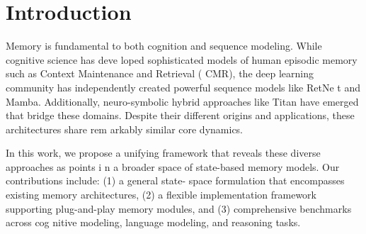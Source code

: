 \section{Introduction}
Memory is fundamental to both cognition and sequence modeling. While cognitive science has deve  loped sophisticated models of human episodic memory such as Context Maintenance and Retrieval (  CMR), the deep learning community has independently created powerful sequence models like RetNe  t and Mamba. Additionally, neuro-symbolic hybrid approaches like Titan have emerged that bridge   these domains. Despite their different origins and applications, these architectures share rem  arkably similar core dynamics.

In this work, we propose a unifying framework that reveals these diverse approaches as points i  n a broader space of state-based memory models. Our contributions include: (1) a general state-  space formulation that encompasses existing memory architectures, (2) a flexible implementation   framework supporting plug-and-play memory modules, and (3) comprehensive benchmarks across cog  nitive modeling, language modeling, and reasoning tasks.

